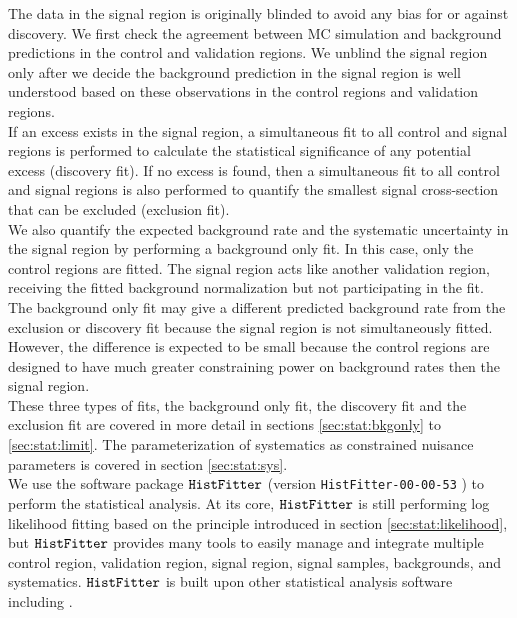 \indent The data in the signal region is originally blinded to avoid any bias for or against discovery.  We first check the agreement between MC simulation and background predictions in the control and validation regions.  We unblind the signal region only after we decide the background prediction in the signal region is well understood based on these observations in the control regions and validation regions. \\

\indent If an excess exists in the signal region, a simultaneous fit to all control and signal regions is performed to calculate the statistical significance of any potential excess (discovery fit).   If no excess is found, then a simultaneous fit to all control and signal regions is also performed to quantify the smallest signal cross-section that can be excluded (exclusion fit).  \\

\indent We also quantify the expected background rate and the systematic uncertainty in the signal region by performing a background only fit.  In this case, only the control regions are fitted. The signal region acts like another validation region, receiving the fitted background normalization but not participating in the fit.  The background only fit may give a different predicted background rate from the exclusion or discovery fit because the signal region is not simultaneously fitted.  However, the difference is expected to be small because the control regions are designed to have much greater constraining power on background rates then the signal region.  \\

\indent These three types of fits, the background only fit, the discovery fit and the exclusion fit are covered in more detail in sections \ref{sec:stat:bkgonly} to \ref{sec:stat:limit}. The parameterization of systematics as constrained nuisance parameters is covered in section \ref{sec:stat:sys}. \\

\indent We use the software package ${\tt HistFitter}$ (version {\tt HistFitter-00-00-53} ) to perform the statistical analysis.\cite{HistFitter}  At its core, ${\tt HistFitter}$ is still performing log likelihood fitting based on the principle introduced in section \ref{sec:stat:likelihood}, but ${\tt HistFitter}$ provides many tools to easily manage and integrate multiple control region, validation region, signal region, signal samples, backgrounds, and systematics.  ${\tt HistFitter}$ is built upon other statistical analysis software including \RooFit.\cite{RooFit}

